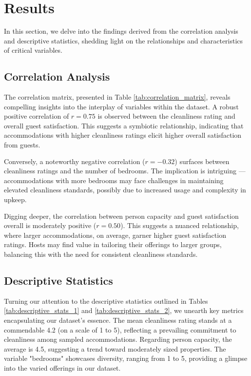 \documentclass[12pt, letterpaper]{article}
\begin{document}
\section*{Results}

In this section, we delve into the findings derived from the correlation analysis and descriptive statistics, shedding light on the relationships and characteristics of critical variables.

\subsection*{Correlation Analysis}

The correlation matrix, presented in Table \ref{tab:correlation_matrix}, reveals compelling insights into the interplay of variables within the dataset. A robust positive correlation of \(r = 0.75\) is observed between the cleanliness rating and overall guest satisfaction. This suggests a symbiotic relationship, indicating that accommodations with higher cleanliness ratings elicit higher overall satisfaction from guests.

Conversely, a noteworthy negative correlation (\(r = -0.32\)) surfaces between cleanliness ratings and the number of bedrooms. The implication is intriguing — accommodations with more bedrooms may face challenges in maintaining elevated cleanliness standards, possibly due to increased usage and complexity in upkeep.

Digging deeper, the correlation between person capacity and guest satisfaction overall is moderately positive (\(r = 0.50\)). This suggests a nuanced relationship, where larger accommodations, on average, garner higher guest satisfaction ratings. Hosts may find value in tailoring their offerings to larger groups, balancing this with the need for consistent cleanliness standards.

\subsection*{Descriptive Statistics}

Turning our attention to the descriptive statistics outlined in Tables \ref{tab:descriptive_stats_1} and \ref{tab:descriptive_stats_2}, we unearth key metrics encapsulating our dataset's essence. The mean cleanliness rating stands at a commendable 4.2 (on a scale of 1 to 5), reflecting a prevailing commitment to cleanliness among sampled accommodations. Regarding person capacity, the average is 4.5, suggesting a trend toward moderately sized properties. The variable "bedrooms" showcases diversity, ranging from 1 to 5, providing a glimpse into the varied offerings in our dataset.
\end{document}
